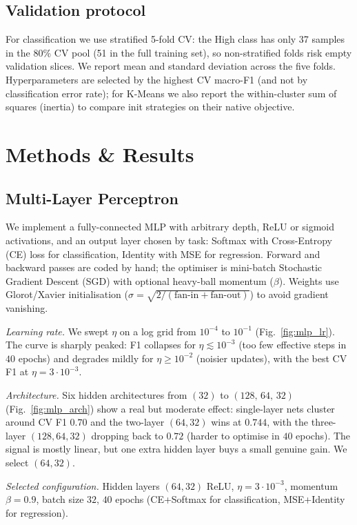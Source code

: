 \documentclass[10pt,twocolumn,a4paper]{article}
\begin{document}
\subsection{Validation protocol}
For classification we use stratified 5-fold CV: the High class has only
37 samples in the 80\% CV pool (51 in the full training set), so
non-stratified folds risk empty validation slices. We report mean and standard deviation across
the five folds. Hyperparameters are selected by the highest CV
macro-F1 (and not by classification error rate); for K-Means we also
report the within-cluster sum of squares (inertia) to compare init
strategies on their native objective.

\section{Methods \& Results}

\subsection{Multi-Layer Perceptron}
\label{sec:mlp}
We implement a fully-connected MLP with arbitrary depth, ReLU or
sigmoid activations, and an output layer chosen by task: Softmax with
Cross-Entropy (CE) loss for classification, Identity with MSE for
regression. Forward and backward passes are coded by hand; the
optimiser is mini-batch Stochastic Gradient Descent (SGD) with optional
heavy-ball momentum ($\beta$). Weights use Glorot/Xavier initialisation
($\sigma{=}\sqrt{2/(\text{fan-in}{+}\text{fan-out})}$) to avoid
gradient vanishing.

\emph{Learning rate.} We swept $\eta$ on a log grid from $10^{-4}$ to
$10^{-1}$ (Fig.~\ref{fig:mlp_lr}). The curve is sharply peaked: F1
collapses for $\eta\!\lesssim\!10^{-3}$ (too few effective steps in
$40$ epochs) and degrades mildly for $\eta\!\geq\!10^{-2}$ (noisier
updates), with the best CV F1 at $\eta{=}3{\cdot}10^{-3}$.

\smallskip
\emph{Architecture.} Six hidden architectures from $(32)$ to
$(128,\,64,\,32)$ (Fig.~\ref{fig:mlp_arch}) show a real but moderate
effect: single-layer nets cluster around CV F1 $0.70$ and the
two-layer $(64,32)$ wins at $\mathbf{0.744}$, with the three-layer
$(128,64,32)$ dropping back to $0.72$ (harder to optimise in $40$
epochs). The signal is mostly linear, but one extra hidden layer buys
a small genuine gain. We select $(64,32)$.

\smallskip
\emph{Selected configuration.} Hidden layers $(64,32)$ ReLU,
$\eta{=}3{\cdot}10^{-3}$, momentum $\beta{=}0.9$, batch size $32$,
$40$ epochs (CE+Softmax for classification, MSE+Identity for
regression).
\end{document}

